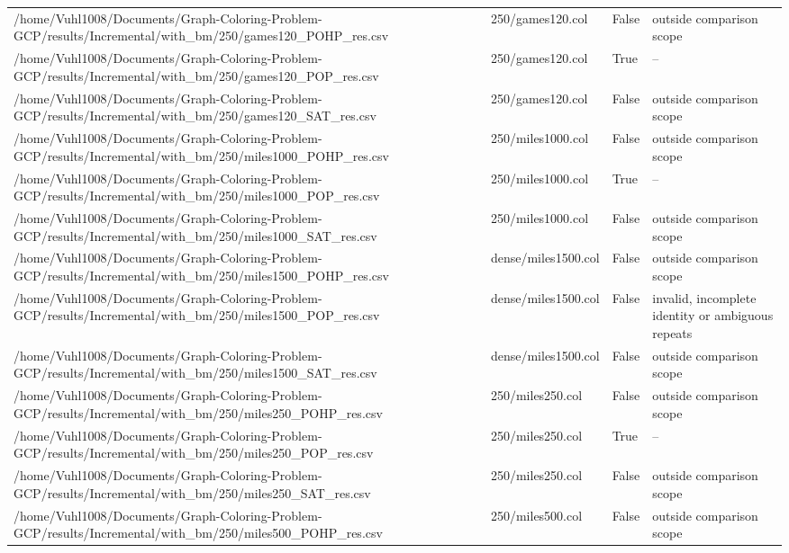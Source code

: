 \begin{table}[htbp]
\begin{tabular}{llll}
/home/Vuhl1008/Documents/Graph-Coloring-Problem-GCP/results/Incremental/with\_bm/250/games120\_POHP\_res.csv & 250/games120.col & False & outside comparison scope \\
/home/Vuhl1008/Documents/Graph-Coloring-Problem-GCP/results/Incremental/with\_bm/250/games120\_POP\_res.csv & 250/games120.col & True & -- \\
/home/Vuhl1008/Documents/Graph-Coloring-Problem-GCP/results/Incremental/with\_bm/250/games120\_SAT\_res.csv & 250/games120.col & False & outside comparison scope \\
/home/Vuhl1008/Documents/Graph-Coloring-Problem-GCP/results/Incremental/with\_bm/250/miles1000\_POHP\_res.csv & 250/miles1000.col & False & outside comparison scope \\
/home/Vuhl1008/Documents/Graph-Coloring-Problem-GCP/results/Incremental/with\_bm/250/miles1000\_POP\_res.csv & 250/miles1000.col & True & -- \\
/home/Vuhl1008/Documents/Graph-Coloring-Problem-GCP/results/Incremental/with\_bm/250/miles1000\_SAT\_res.csv & 250/miles1000.col & False & outside comparison scope \\
/home/Vuhl1008/Documents/Graph-Coloring-Problem-GCP/results/Incremental/with\_bm/250/miles1500\_POHP\_res.csv & dense/miles1500.col & False & outside comparison scope \\
/home/Vuhl1008/Documents/Graph-Coloring-Problem-GCP/results/Incremental/with\_bm/250/miles1500\_POP\_res.csv & dense/miles1500.col & False & invalid, incomplete identity or ambiguous repeats \\
/home/Vuhl1008/Documents/Graph-Coloring-Problem-GCP/results/Incremental/with\_bm/250/miles1500\_SAT\_res.csv & dense/miles1500.col & False & outside comparison scope \\
/home/Vuhl1008/Documents/Graph-Coloring-Problem-GCP/results/Incremental/with\_bm/250/miles250\_POHP\_res.csv & 250/miles250.col & False & outside comparison scope \\
/home/Vuhl1008/Documents/Graph-Coloring-Problem-GCP/results/Incremental/with\_bm/250/miles250\_POP\_res.csv & 250/miles250.col & True & -- \\
/home/Vuhl1008/Documents/Graph-Coloring-Problem-GCP/results/Incremental/with\_bm/250/miles250\_SAT\_res.csv & 250/miles250.col & False & outside comparison scope \\
/home/Vuhl1008/Documents/Graph-Coloring-Problem-GCP/results/Incremental/with\_bm/250/miles500\_POHP\_res.csv & 250/miles500.col & False & outside comparison scope \\

\end{tabular}
\end{table}
